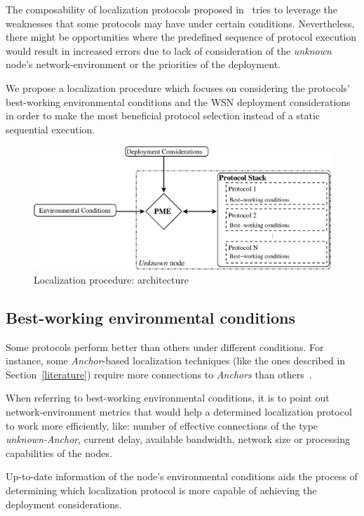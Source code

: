 The composability of localization protocols proposed in~\cite{composability} tries to leverage the weaknesses that some protocols may have under certain conditions. Nevertheless, there might be opportunities where the predefined sequence of protocol execution would result in increased errors due to lack of consideration of the \emph{unknown} node's network-environment or the priorities of the deployment.

We propose a localization procedure which focuses on considering the protocols' best-working environmental conditions and the WSN deployment considerations in order to make the most beneficial protocol selection instead of a static sequential execution.

\begin{figure}[htbp]
  \centering
  \includegraphics[width=0.83\linewidth]{section3/figures/LocProc_small.eps}
  \caption{Localization procedure: architecture
  \label{fig:LocProc}}
\end{figure}

\subsection{Best-working environmental conditions}\label{bestWorkingConditions}
Some protocols perform better than others under different conditions. For instance, some \emph{Anchor}-based localization techniques (like the ones described in Section~\ref{literature}) require more connections to \emph{Anchors} than others~\cite{rang:loc:techniques}.

When referring to best-working environmental conditions, it is to point out network-environment metrics that would help a determined localization protocol to work more efficiently, like: number of effective connections of the type \emph{unknown-Anchor}, current delay, available bandwidth, network size or processing capabilities of the nodes.

Up-to-date information of the node's environmental conditions aids the process of determining which localization protocol is more capable of achieving the deployment considerations.

